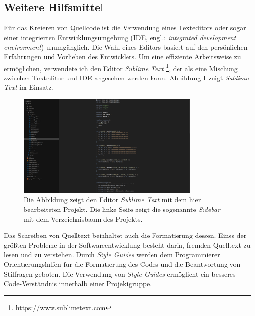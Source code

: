 \documentclass[crop=false]{standalone}
\begin{document}
  \subsection{Weitere Hilfsmittel} %
  \label{sub:weitere_hilfsmittel}
    Für das Kreieren von Quellcode ist die Verwendung eines Texteditors oder sogar einer integrierten Entwicklungsumgebung (IDE, engl.: \textit{integrated development environment}) unumgänglich.
    Die Wahl eines Editors basiert auf den persönlichen Erfahrungen und Vorlieben des Entwicklers.
    Um eine effiziente Arbeitsweise zu ermöglichen, verwendete ich den Editor \textit{Sublime Text}%
    \footnote{https://www.sublimetext.com}, der als eine Mischung zwischen Texteditor und IDE angesehen werden kann.
    Abbildung \ref{fig:sublime-text-example} zeigt \textit{Sublime Text} im Einsatz.
    \begin{figure}
      \center
      \includegraphics[width=0.8\textwidth]{images/sublime_text_example.png}
      \caption{%
        Die Abbildung zeigt den Editor \textit{Sublime Text} mit dem hier bearbeiteten Projekt.
        Die linke Seite zeigt die sogenannte \textit{Sidebar} mit dem Verzeichnisbaum des Projekts.
      }
      \label{fig:sublime-text-example}
    \end{figure}

    Das Schreiben von Quelltext beinhaltet auch die Formatierung dessen.
    Eines der größten Probleme in der Softwareentwicklung besteht darin, fremden Quelltext zu lesen und zu verstehen.
    Durch \textit{Style Guides} werden dem Programmierer Orientierungshilfen für die Formatierung des Codes und die Beantwortung von Stilfragen geboten.
    Die Verwendung von \textit{Style Guides} ermöglicht ein besseres Code-Verständnis innerhalb einer Projektgruppe.

\end{document}
